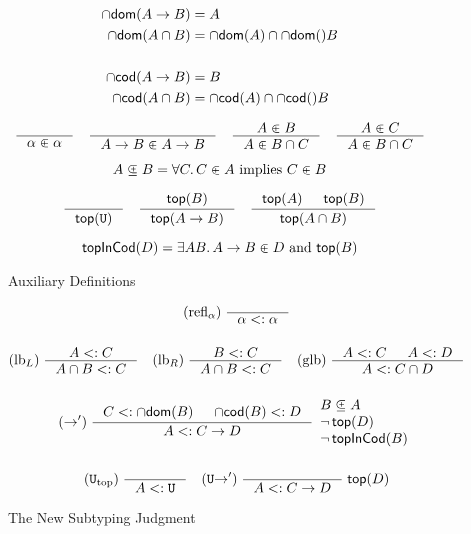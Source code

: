 \documentclass{article}
\begin{document}
\begin{figure}[tbp]

  \begin{align*}
  \dom{A \to B} &= A \\
  \dom{A \cap B} &= \dom{A} \cap \dom {B} \\
  \\
  \cod{A \to B} &= B \\
  \cod{A \cap B} &= \cod{A} \cap \cod {B}
  \end{align*}

  \begin{gather*}
    \inference{}{\alpha \inside \alpha}  \quad
    \inference{}{A \to B \inside A \to B} \quad
    \inference{A \inside B}{A \inside B \cap C} \quad
    \inference{A \inside C}{A \inside B \cap C}
  \end{gather*}

  \[
     A \subsetpluseq B = \forall C.\, C \inplus A \text{ implies } C \inplus B
  \]

  \begin{gather*}
    \inference{}{\topP{\TOP}}
    \quad
    \inference{\topP{B}}{\topP{A \to B}}
    \quad
    \inference{\topP{A} & \topP{B}}{\topP{A \cap B}}
  \end{gather*}

  \[
  \mathsf{topInCod}(D) =
     \exists A B.\, A \to B \inplus D \text{ and } \mathsf{top}(B)  
  \]

  \caption{Auxiliary Definitions}
  \label{fig:aux}
\end{figure}


\begin{figure}[tbp]
  \begin{gather*}
    \text{(refl$_\alpha$)} \; \inference{}{\alpha <: \alpha} \\[3ex]
    \text{(lb$_L$)} \; \inference{A <: C}{A \cap B <: C} \quad
    \text{(lb$_R$)} \; \inference{B <: C}{A \cap B <: C} \quad
    \text{(glb)} \; \inference{A <: C & A <: D}{A <: C \cap D} \\[3ex]
    (\to') \; \inference{C <: \dom{B} & \cod{B} <: D }{A <: C \to D}
    \begin{array}{l}
      B \containedin A\\
      \neg\, \mathsf{top}(D) \\
      \neg \, \mathsf{topInCod}(B)
      \end{array}\\[3ex]
    (\TOP_{\mathrm{top}}) \; \inference{}{A <: \TOP} \quad
    (\TOP{\to}') \; \inference{}{A <: C \to D}\;\mathsf{top}(D)
  \end{gather*}
  \caption{The New Subtyping Judgment}
  \label{fig:new-subtyping}
\end{figure}
\end{document}
